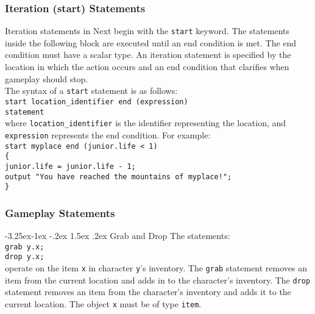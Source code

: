 \documentclass[12pt]{article}
\makeatletter
\renewcommand\paragraph{\@startsection{paragraph}{4}{\z@}%
  {-3.25ex\@plus -1ex \@minus -.2ex}%
  {1.5ex \@plus .2ex}%
  {\normalfont\normalsize\bfseries}}
\makeatother
\begin{document}
\subsubsection{Iteration (start) Statements}

Iteration statements in Next begin with the \texttt{start} keyword.  The statements inside the following block are executed until an end condition is met.  The end condition must have a scalar type.  An iteration statement is specified by the location in which the action occurs and an end condition that clarifies when gameplay should stop. \\

\noindent The syntax of a \texttt{start} statement is as follows: \\

\texttt{start location\_identifier end (expression)} \\
\indent \indent \texttt{statement} \\

\noindent where \texttt{location\_identifier} is the identifier representing the location, and \texttt{expression} represents the end condition.  For example: \\

\texttt{start myplace end (junior.life < 1)} \\
\indent \texttt{\{} \\
\indent \indent \texttt{junior.life = junior.life - 1;} \\
\indent \indent \texttt{output "You have reached the mountains of myplace!";} \\
\indent \texttt{\}}

\subsubsection{Gameplay Statements}
\paragraph{Grab and Drop}
The statements: \\

\texttt{grab y.x;} \\
\indent \texttt{drop y.x;} \\

\noindent operate on the item \texttt{x} in character \texttt{y}'s inventory.  The \texttt{grab} statement removes an item from the current location and adds in to the character's inventory.  The \texttt{drop} statement removes an item from the character's inventory and adds it to the current location.  The object \texttt{x} must be of type \texttt{item}.
\end{document}
